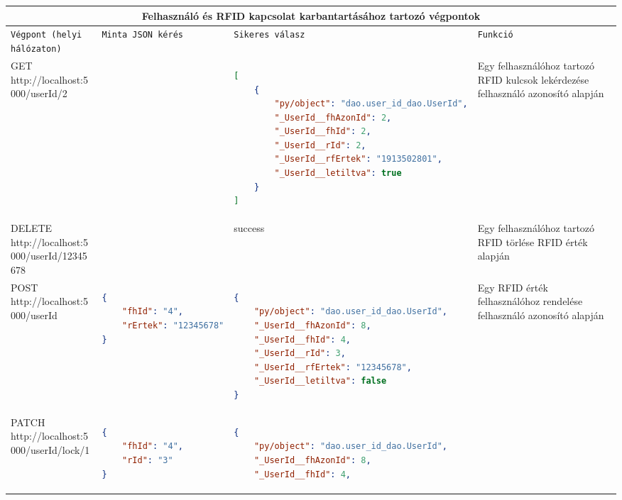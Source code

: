 \documentclass[11pt, a4paper]{article}
\begin{document}
\begin{minipage}{\linewidth}
	\fontsize{6}{8}\selectfont
	\centering
	\begin{tabular}{|m{20em} | m{12em} | m{23em} | m{10em}|}
		\hline
		\multicolumn{4}{|c|}{\textbf{Felhasználó és RFID kapcsolat karbantartásához tartozó végpontok}} \\
		\hline
		\texttt{Végpont \newline{} (helyi hálózaton)} & \texttt{Minta JSON kérés} & \texttt{Sikeres válasz} & \texttt{Funkció} \\
		\hline
		GET \newline{} http://localhost:5000/userId/2 &  &
		\fontsize{6}{2}\selectfont \begin{lstlisting}[language=json]
[
	{
		"py/object": "dao.user_id_dao.UserId",
		"_UserId__fhAzonId": 2,
		"_UserId__fhId": 2,
		"_UserId__rId": 2,
		"_UserId__rfErtek": "1913502801",
		"_UserId__letiltva": true
	}
]
		\end{lstlisting}
		& Egy felhasználóhoz tartozó RFID kulcsok lekérdezése felhasználó azonosító alapján \\
		\hline
		DELETE \newline{} http://localhost:5000/userId/12345678 &  & success
		& Egy felhasználóhoz tartozó RFID törlése RFID érték alapján \\
		\hline
		POST \newline{} http://localhost:5000/userId &
		\fontsize{6}{2}\selectfont \begin{lstlisting}[language=json]
{
	"fhId": "4",
	"rErtek": "12345678"
}
		\end{lstlisting}
		&
		\fontsize{6}{2}\selectfont \begin{lstlisting}[language=json]
{
	"py/object": "dao.user_id_dao.UserId",
	"_UserId__fhAzonId": 8,
	"_UserId__fhId": 4,
	"_UserId__rId": 3,
	"_UserId__rfErtek": "12345678",
	"_UserId__letiltva": false
}
		\end{lstlisting}
		& Egy RFID érték felhasználóhoz rendelése felhasználó azonosító alapján \\
		\hline
		PATCH \newline{} http://localhost:5000/userId/lock/1 &
		\fontsize{6}{2}\selectfont \begin{lstlisting}[language=json]
{
	"fhId": "4",
	"rId": "3"
}
		\end{lstlisting}
		&
		\fontsize{6}{2}\selectfont \begin{lstlisting}[language=json]
{
	"py/object": "dao.user_id_dao.UserId",
	"_UserId__fhAzonId": 8,
	"_UserId__fhId": 4,

\end{lstlisting}
\end{tabular}
\end{minipage}
\end{document}
